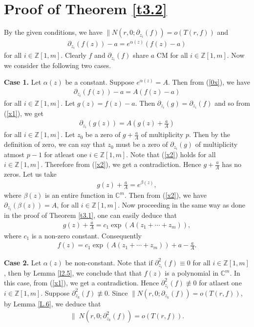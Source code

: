\documentclass[11pt, reqno]{amsart}
\newcommand{\bea}{\begin{eqnarray}}
\newcommand{\eea}{\end{eqnarray}}
\numberwithin{equation}{section}
\begin{document}
\section {{\bf Proof of Theorem \ref{t3.2}}}
By the given conditions, we have $\parallel N(r,0;\partial_{z_i}(f))=o(T(r,f))$ and 
\bea\label{0x} \partial_{z_i}(f(z))-a=e^{\alpha(z)}(f(z)-a)\eea
for all $i\in\mathbb{Z}[1,m]$. Clearly $f$ and $\partial_{z_i}(f)$ share $a$ CM for all $i\in\mathbb{Z}[1,m]$. 
Now we consider the following two cases.\vspace{1.2mm}

{\bf Case 1.} Let $\alpha(z)$ be a constant. Suppose $e^{\alpha(z)}=A$. Then from (\ref{0x}), we have
\begin{align}\label{x1}
\partial_{z_i}(f(z))-a=A(f(z)-a)
\end{align}
for all $i\in\mathbb{Z}[1,m]$. Let $g(z)=f(z)-a$. Then $\partial_{z_i}(g)=\partial_{z_i}(f)$ and so from (\ref{x1}), we get
\begin{align}\label{x2} 
\partial_{z_i}(g(z))=A\left(g(z)+\frac{a}{A}\right)
\end{align}
for all $i\in\mathbb{Z}[1,m]$. Let $z_0$ be a zero of $g+\frac{a}{A}$ of multiplicity $p$. Then by the definition of zero, we can say that $z_0$ must be a zero of $\partial_{z_i}(g)$ of multiplicity atmost $p-1$ for atleast one $i\in\mathbb{Z}[1,m]$. Note that (\ref{x2}) holds for all $i\in\mathbb{Z}[1,m]$. Therefore from (\ref{x2}), we get a contradiction. Hence $g+\frac{a}{A}$ has no zeros.
Let us take 
\begin{align*}
g(z)+\frac{a}{A}=e^{\beta(z)},
\end{align*}
where $\beta(z)$ is an entire function in $\mathbb{C}^m$. Then from (\ref{x2}), we have 
$\partial_{z_i}(\beta(z))=A$,
for all $i\in\mathbb{Z}[1,m]$. Now proceeding in the same way as done in the proof of Theorem \ref{t3.1}, one can easily deduce that 
\begin{align*}
g(z)+\frac{a}{A}=c_1\exp(A(z_1+ \cdots+z_m)),
\end{align*}
where $c_1$ is a non-zero constant. Consequently
\begin{align*}
f(z)=c_1\exp(A(z_1+ \cdots+z_m))+a-\frac{a}{A}.
\end{align*}
\vspace{1.2mm}

{\bf Case 2.} Let $\alpha(z)$ be non-constant. Note that if $\partial_{z_i}^2(f)\equiv 0$ for all $i\in\mathbb{Z}[1,m]$, then by Lemma \ref{l2.5}, we conclude that that $f(z)$ is a polynomial in $\mathbb{C}^m$. In this case, from (\ref{x1}), we get a contradiction. Hence $\partial_{z_i}^2(f)\not\equiv 0$ for atlaest one $i\in\mathbb{Z}[1,m]$. Suppose $\partial_{z_k}^2(f)\not\equiv 0$. Since $\parallel N(r,0;\partial_{z_k}(f))=o(T(r,f))$, by Lemma \ref{L.6}, we deduce that
\begin{align}
\label{x0} \parallel\;N(r,0;\partial_{z_k}^2(f))=o(T(r,f)).
\end{align}
\end{document}
